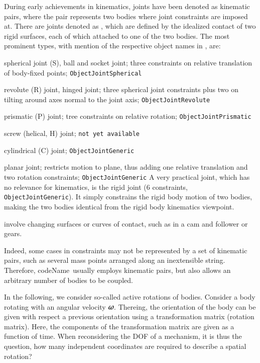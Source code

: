 During early achievements in kinematics, joints have been denoted as kinematic pairs, where the pair represents two bodies where joint constraints are imposed at. There are joints denoted as , which are defined by the idealized contact of two rigid surfaces, each of which attached to one of the two bodies. The most prominent types, with mention of the respective object names in \codeName, are:
\bi
  \item spherical joint (S), ball and socket joint; three constraints on relative translation of body-fixed points; \texttt{ObjectJointSpherical}
  \item revolute (R) joint, hinged joint; three spherical joint constraints plus two on tilting around axes normal to the joint axis; \texttt{ObjectJointRevolute}
  \item prismatic (P) joint; tree constraints on relative rotation; \texttt{ObjectJointPrismatic}
  \item screw (helical, H) joint; \texttt{not yet available}
  \item cylindrical (C) joint; \texttt{ObjectJointGeneric}
  \item planar joint; restricts motion to plane, thus adding one relative translation and two rotation constraints; \texttt{ObjectJointGeneric}
\ei
A very practical joint, which has no relevance for kinematics, is the rigid joint (6 constraints, \texttt{ObjectJointGeneric}). It simply constrains the rigid body motion of two bodies, making the two bodies identical from the rigid body kinematics viewpoint.

 involve changing surfaces or curves of contact, such as in a cam and follower or gears.

Indeed, some cases in constraints may not be represented by a set of kinematic pairs, such as several mass points arranged along an inextensible string. Therefore, codeName\ usually employs kinematic pairs, but also allows an arbitrary number of bodies to be coupled.


In the following, we consider so-called active rotations of bodies. Consider a body rotating with an angular velocity $\mbox{\boldmath $\omega$ \unboldmath}\!\!$. Thereing, the orientation of the body can be given with respect a previous orientation using a transformation matrix (rotation matrix).
Here, the components of the transformation matrix are given as a function of time. When reconsidering the \ac{DOF} of a mechanism, it is thus the question, how many independent coordinates are required to describe a spatial rotation?

